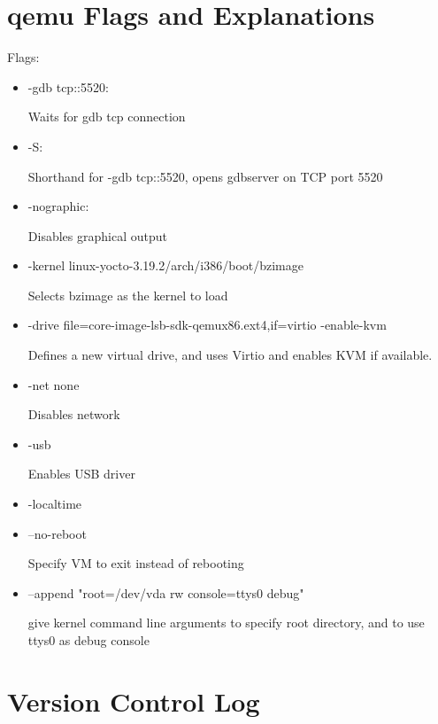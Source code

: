 \documentclass[onecolumn, draftclsnofoot,10pt, compsoc]{IEEEtran}
\begin{document}
\section{qemu Flags and Explanations}
Flags:
\begin{itemize}
    \item -gdb tcp::5520:
    
        Waits for gdb tcp connection
    \item -S:
    
        Shorthand for -gdb tcp::5520, opens gdbserver on TCP port 5520
    \item -nographic:
    
        Disables graphical output
    \item -kernel linux-yocto-3.19.2/arch/i386/boot/bzimage
    
        Selects bzimage as the kernel to load
    \item -drive file=core-image-lsb-sdk-qemux86.ext4,if=virtio -enable-kvm
    
        Defines a new virtual drive, and uses Virtio and enables KVM if available.
    \item -net none
    
        Disables network
    \item -usb
    
        Enables USB driver
    \item -localtime
    
    \item --no-reboot
    
        Specify VM to exit instead of rebooting
    \item --append "root=/dev/vda rw console=ttys0 debug"
    
        give kernel command line arguments to specify root directory, and to use ttys0 as debug console
\end{itemize}

\newpage
\section{Version Control Log}

\end{document}
